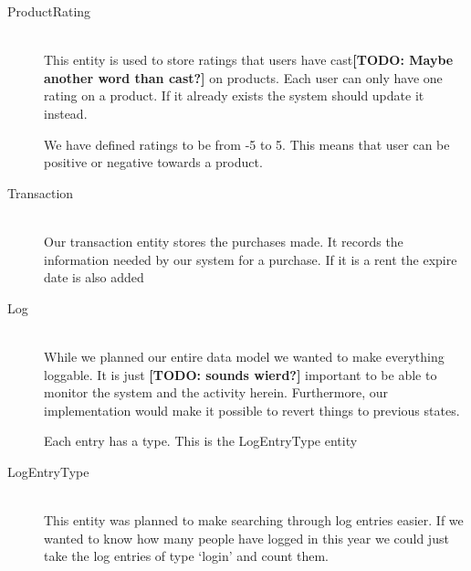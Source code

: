 \begin{description}
\item[ProductRating] \hfill \\
This entity is used to store ratings that users have cast\textbf{[TODO: Maybe another word than cast?]} on products. Each user can only have one rating on a product. If it already exists the system should update it instead.

We have defined ratings to be from -5 to 5. This means that user can be positive or negative towards a product.

\item[Transaction] \hfill \\
Our transaction entity stores the purchases made. It records the information needed by our system for a purchase. If it is a rent the expire date is also added

\item[Log] \hfill \\
While we planned our entire data model we wanted to make everything loggable. It is just \textbf{[TODO: sounds wierd?]} important to be able to monitor the system and the activity herein. Furthermore, our implementation would make it possible to revert things to previous states.

Each entry has a type. This is the LogEntryType entity

\item[LogEntryType] \hfill \\
This entity was planned to make searching through log entries easier. If we wanted to know how many people have logged in this year we could just take the log entries of type `login' and count them.
\end{description}